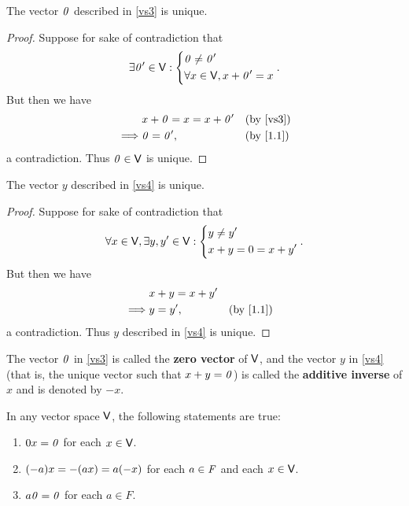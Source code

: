 \begin{cor}\label{1.2.14}
  The vector \(\mathit{0}\) described in \ref{vs3} is unique.
\end{cor}

\begin{proof}
  Suppose for sake of contradiction that
  \[
    \exists \mathit{0}' \in \mathsf{V} : \begin{dcases}
      \mathit{0} \neq \mathit{0}' \\
      \forall x \in \mathsf{V}, x + \mathit{0}' = x
    \end{dcases}.
  \]
  But then we have
  \begin{align*}
             & x + \zv = x = x + \zv' &  & \text{(by \ref{vs3})}  \\
    \implies & \zv = \zv',            &  & \text{(by \cref{1.1})}
  \end{align*}
  a contradiction.
  Thus \(\mathit{0} \in \mathsf{V}\) is unique.
\end{proof}

\begin{cor}\label{1.2.15}
  The vector \(y\) described in \ref{vs4} is unique.
\end{cor}

\begin{proof}
  Suppose for sake of contradiction that
  \[
    \forall x \in \mathsf{V}, \exists y, y' \in \mathsf{V} : \begin{dcases}
      y \neq y' \\
      x + y = 0 = x + y'
    \end{dcases}.
  \]
  But then we have
  \begin{align*}
             & x + y = x + y'                             \\
    \implies & y = y',        &  & \text{(by \cref{1.1})}
  \end{align*}
  a contradiction.
  Thus \(y\) described in \ref{vs4} is unique.
\end{proof}

\begin{defn}\label{1.2.16}
  The vector \(\mathit{0}\) in \ref{vs3} is called the \textbf{zero vector} of \(\mathsf{V}\), and the vector \(y\) in \ref{vs4} (that is, the unique vector such that \(x + y = \mathit{0}\)) is called the \textbf{additive inverse} of \(x\) and is denoted by \(-x\).
\end{defn}

\begin{thm}\label{1.2}
  In any vector space \(\mathsf{V}\), the following statements are true:
  \begin{enumerate}
    \item \(0x = \mathit{0}\) for each \(x \in \mathsf{V}\).
    \item \(\p{-a}x = -\p{ax} = a\p{-x}\) for each \(a \in \mathit{F}\) and each \(x \in \mathsf{V}\).
    \item \(a\mathit{0} = \mathit{0}\) for each \(a \in F\).
  \end{enumerate}
\end{thm}

